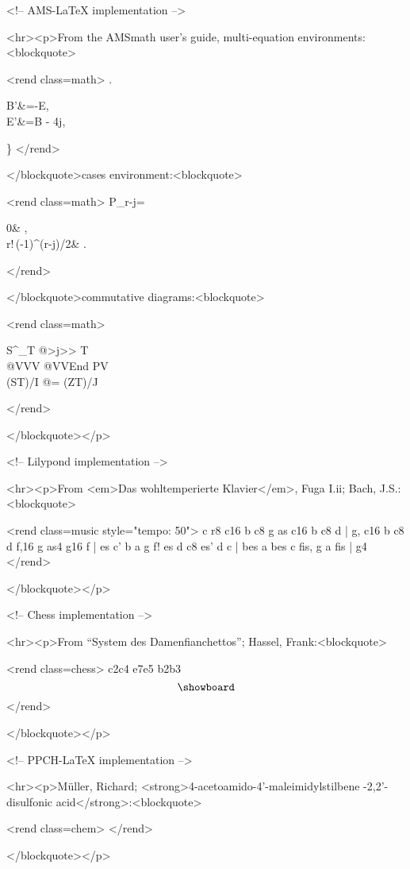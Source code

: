 <!-- AMS-LaTeX implementation -->

	<hr><p>From the AMSmath user's guide, multi-equation environments:
	<blockquote>

	<rend class=math>
		\left.\begin{aligned}
		B'&=-\partial\times E,\\
		E'&=\partial\times B - 4\pi j,
		\end{aligned}
		\right\}
		\qquad {}
	</rend>

	</blockquote>cases environment:<blockquote>
	
	<rend class=math>
		P_{r-j}=
		\begin{cases}
		0& ,\\
		r!\,(-1)^{(r-j)/2}& .
		\end{cases}
	</rend>
	
	</blockquote>commutative diagrams:<blockquote>
	
	<rend class=math>
		\begin{CD}
		S^{{}_\Lambda}\otimes T   @>j>>   T\\
		@VVV                                    @VV{End P}V\\
		(S\otimes T)/I                  @=      (Z\otimes T)/J
		\end{CD}
	</rend>
	
	</blockquote></p>

<!-- Lilypond implementation -->

	<hr><p>From <em>Das wohltemperierte Klavier</em>,
	Fuga I.ii; Bach, J.S.:<blockquote>
	
	<rend class=music style="tempo: 50">
		\key c \minor
			r8 c16 b c8 g as c16 b c8 d |
			g, c16 b c8 d f,16 g as4 g16 f |
			es c' b a g f! es d c8 es' d c |
			bes a bes c fis, g a fis |
			g4
	</rend>
	
	</blockquote></p>

<!-- Chess implementation -->
  
	<hr><p>From “System des Damenfianchettos”; Hassel, Frank:<blockquote>

	<rend class=chess>
		\newgame
		\move c2c4 e7e5
		\ply b2b3
		$$\showboard$$
	</rend>
	
	</blockquote></p>
	
<!-- PPCH-LaTeX implementation -->
  
	<hr><p>Müller, Richard; <strong>4-acetoamido-4'-maleimidylstilbene
	-2,2'-disulfonic acid</strong>:<blockquote>

	<rend class=chem>
		\startchemical[scale=small,size=big,height=fit,width=fit]
		\stopchemical
	</rend>
	
	</blockquote></p>